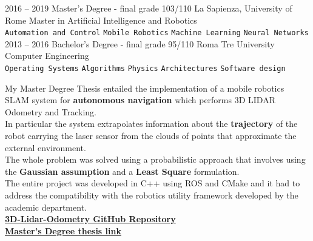 \documentclass[9pt]{developercv} %
\begin{document}
\newpage


\begin{entrylist}
	\entry
		{2016 -- 2019}
		{Master's Degree - final grade 103/110}
		{La Sapienza, University of Rome}
		{Master in Artificial Intelligence and Robotics\\
                \texttt{Automation and Control}\slashsep
                \texttt{Mobile Robotics}\slashsep
                \texttt{Machine Learning}\slashsep
                \texttt{Neural Networks}
                }
	\entry
		{2013 -- 2016}
		{Bachelor's Degree - final grade 95/110}
		{Roma Tre University }
		{Computer Engineering \\
                \texttt{Operating Systems}\slashsep
                \texttt{Algorithms}\slashsep
                \texttt{Physics}\slashsep
                \texttt{Architectures}\slashsep
                \texttt{Software design}
                }
\end{entrylist}



My Master Degree Thesis entailed the implementation of a mobile robotics SLAM system for \textbf{autonomous navigation} which performs 3D LIDAR Odometry and Tracking.\\
In particular the system extrapolates information about the \textbf{trajectory} of the robot carrying the laser sensor from the clouds of points that approximate the external environment.\\
The whole problem was solved using a probabilistic approach that involves using the \textbf{Gaussian assumption} and a \textbf{Least Square} formulation.\\
The entire project was developed in C++ using ROS and CMake and it had to address the compatibility with the robotics utility framework developed by the academic department.\\

\href{https://github.com/dinies/3D-Lidar-Odometry-and-Tracking}
{\textbf{3D-Lidar-Odometry GitHub Repository}}\\
\href{https://github.com/dinies/MasterThesis-ArtificialIntelligence-Robotics/blob/master/MaterThesis_Edoardo_Ghini.pdf }
{\textbf{Master's Degree thesis link}}\\
\end{document}
